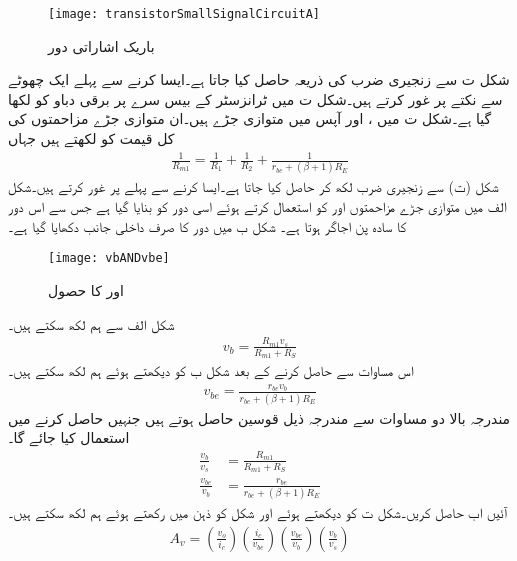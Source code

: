 \begin{figure}
\centering
\texttt{[image: transistorSmallSignalCircuitA]}
\caption{باریک اشاراتی دور}
\label{شکل_ٹرانزسٹر_باریک_اشاراتی_دور_الف}
\end{figure}
	شکل  ت سے زنجیری ضرب کی ذریعہ   حاصل کیا جاتا ہے۔ایسا کرنے سے پہلے ایک چھوٹے سے نکتے پر غور کرتے ہیں۔شکل  ت میں ٹرانزسٹر کے بیس سرے پر برقی دباو کو   لکھا گیا ہے۔شکل  ت میں ،   اور آپس میں متوازی جڑے ہیں۔ان متوازی جڑے مزاحمتوں کی کل قیمت کو  لکھتے ہیں جہاں
\begin{align}
\frac{1}{R_{m1}}=\frac{1}{R_1}+\frac{1}{R_2}+\frac{1}{r_{be}+\left(\beta+1 \right ) R_E}
\end{align}
شکل (ت) سے زنجیری ضرب لکھ کر   حاصل کیا جاتا ہے۔ایسا کرنے سے پہلے   پر غور کرتے ہیں۔شکل  الف میں متوازی جڑے مزاحمتوں  اور  کو استعمال کرتے ہوئے اسی دور کو بنایا گیا ہے جس سے اس دور کا سادہ پن اجاگر ہوتا ہے۔ شکل   ب میں دور کا صرف داخلی جانب دکھایا گیا ہے۔
\begin{figure}
\centering
\texttt{[image: vbANDvbe]}
\caption{ اور  کا حصول}
\label{شکل_داخلی_برقی_دباو_کا_تقسیم}
\end{figure}
شکل  الف سے ہم لکھ سکتے ہیں۔
\begin{align*}
v_b = \frac{R_{m1} v_s}{R_{m1}+R_S}
\end{align*}
اس مساوات سے  حاصل کرنے کے بعد شکل  ب کو دیکھتے ہوئے ہم لکھ سکتے ہیں۔
\begin{align*}
v_{be}=\frac{r_{be} v_b}{r_{be}+\left(\beta+1 \right )R_E}
\end{align*}
مندرجہ بالا دو مساوات سے مندرجہ ذیل قوسین حاصل ہوتے ہیں جنہیں  حاصل کرنے میں استعمال کیا جائے گا۔
\begin{align}
\frac{v_b}{v_s}&=\frac{R_{m1}}{R_{m1}+R_S}\\
\frac{v_{be}}{v_b}&=\frac{r_{be}}{r_{be}+\left(\beta+1 \right )R_E}
\end{align}
	آئیں اب حاصل کریں۔شکل   ت کو دیکھتے ہوئے اور شکل   کو ذہن میں رکھتے ہوئے ہم لکھ سکتے ہیں۔
\begin{align}
A_v=\left(\frac{v_o}{i_c} \right ) \left(\frac{i_c}{v_{be}} \right ) \left(\frac{v_{be}}{v_b} \right ) \left(\frac{v_b}{v_s} \right )
\end{align}
